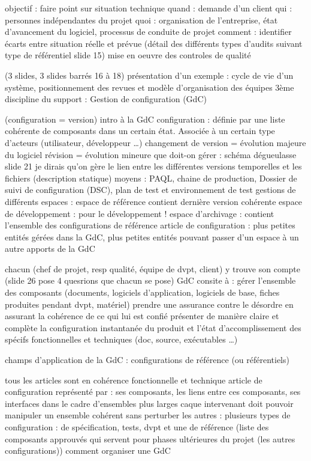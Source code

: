 objectif : faire point sur situation technique
quand : demande d’un client
qui : personnes indépendantes du projet
quoi : organisation de l’entreprise, état d’avancement du logiciel, processus de conduite de projet
comment : identifier écarts entre situation réelle et prévue
(détail des différents types d’audits suivant type de référentiel slide 15)
mise en oeuvre des controles de qualité

(3 slides, 3 slides barrés 16 à 18)
présentation d’un exemple : cycle de vie d’un système, positionnement des revues et modèle d’organisation des équipes
3ème discipline du support : Gestion de configuration (GdC)

(configuration = version)
intro à la GdC
configuration : définie par une liste cohérente de composants dans un certain état. Associée à un certain type d’acteurs (utilisateur, développeur …)
changement de version = évolution majeure du logiciel
révision = évolution mineure
que doit-on gérer : schéma dégueulasse slide 21
je dirais qu’on gère le lien entre les différentes versions temporelles et les fichiers (description statique)
moyens : PAQL, chaine de production, Dossier de suivi de configuration (DSC), plan de test et environnement de test
gestions de différents espaces : espace de référence contient dernière version cohérente
espace de développement : pour le développement !
espace d’archivage : contient l’ensemble des configurations de référence
article de configuration : plus petites entités gérées dans la GdC, plus petites entités pouvant passer d’un espace à un autre
apports de la GdC

chacun (chef de projet, resp qualité, équipe de dvpt, client) y trouve son compte (slide 26 pose 4 quesrions que chacun se pose)
GdC consite à :
gérer l’ensemble des composants (documents, logiciels d’application, logiciels de base, fiches produites pendant dvpt, matériel)
prendre une assurance contre le désordre en assurant la cohérence de ce qui lui est confié
présenter de manière claire et complète la configuration instantanée du produit et l’état d’accomplissement des spécifs fonctionnelles et techniques (doc, source, exécutables …)

champs d’application de la GdC : configurations de référence (ou référentiels)

tous les articles sont en cohérence fonctionnelle et technique
article de configuration représenté par : ses composants, les liens entre ces composants, ses interfaces dans le cadre d’ensembles plus larges
caque intervenant doit pouvoir manipuler un ensemble cohérent sans perturber les autres : plusieurs types de configuration : de spécification, tests, dvpt et une de référence (liste des composants approuvés qui servent pour phases ultérieures du projet (les autres configurations))
comment organiser une GdC

